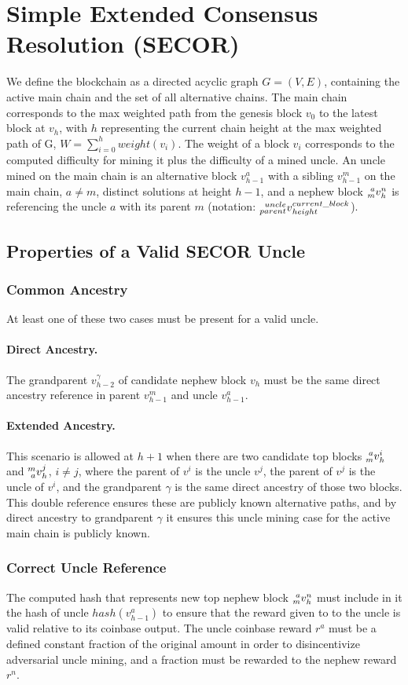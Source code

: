 \documentclass{article}
\begin{document}
\section{Simple Extended Consensus Resolution (SECOR)}
We define the blockchain as a directed acyclic graph $G = (V, E)$, containing the active main chain and the set of all alternative chains. The main chain corresponds to the max weighted path from the genesis block $v_0$ to the latest block at $v_h$, with $h$ representing the current chain height at the max weighted path of G, $W = \sum_{i=0}^{h} weight(v_i)$. The weight of a block $v_i$ corresponds to the computed difficulty for mining it plus the difficulty of a mined uncle. An uncle mined on the main chain is an alternative block $v_{h-1}^a$ with a sibling $v_{h-1}^m$ on the main chain, $a \neq m$, distinct solutions at height $h-1$, and a nephew block $\prescript{a}{m}v_h^n$ is referencing the uncle $a$ with its parent $m$ (notation: $\prescript{uncle}{parent}v_{height}^{current\_block}$).
\subsection{Properties of a Valid SECOR Uncle}
\subsubsection{Common Ancestry}
At least one of these two cases must be present for a valid uncle.
\paragraph{Direct Ancestry.}
The grandparent $v_{h-2}^{\gamma}$ of candidate nephew block $v_h$ must be the same direct ancestry reference in parent $v_{h-1}^m$ and uncle $v_{h-1}^a$.
\paragraph{Extended Ancestry.}
This scenario is allowed at $h+1$ when there are two candidate top blocks $\prescript{a}{m}v_h^i$ and $\prescript{m}{a}v_h^j$, $i \neq j$, where the parent of $v^i$ is the uncle $v^j$, the parent of $v^j$ is the uncle of $v^i$, and the grandparent $\gamma$ is the same direct ancestry of those two blocks. This double reference ensures these are publicly known alternative paths, and by direct ancestry to grandparent $\gamma$ it ensures this uncle mining case for the active main chain is publicly known.
\subsubsection{Correct Uncle Reference}
The computed hash that represents new top nephew block $\prescript{a}{m}v_h^n$ must include in it the hash of uncle $hash(v_{h-1}^a)$ to ensure that the reward given to to the uncle is valid relative to its coinbase output. The uncle coinbase reward $r^a$ must be a defined constant fraction of the original amount in order to disincentivize adversarial uncle mining, and a fraction must be rewarded to the nephew reward $r^n$.
\end{document}
